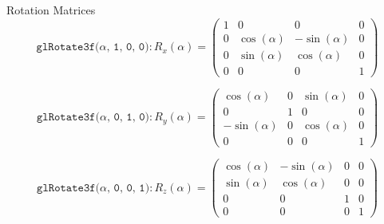 \documentclass[aspectratio=1610,xcolor=dvipsnames,t]{beamer}
\begin{document}
\begin{frame}{Rotation Matrices} 
        \begin{equation*} 
        \texttt{glRotate3f($\alpha$, 1, 0, 0)} :
            R_x(\alpha) = \left(
                        \begin{array}{cccc}
                            1   & 0             & 0                 & 0 \\
                            0   & \cos(\alpha)  & -\sin(\alpha)     & 0 \\
                            0   & \sin(\alpha)  &  \cos(\alpha)    & 0 \\
                            0   & 0             & 0                 & 1
                        \end{array} 
                    \right)
        \end{equation*} 

        \begin{equation*} 
        \texttt{glRotate3f($\alpha$, 0, 1, 0)} :
            R_y(\alpha) = \left(
                        \begin{array}{cccc}
                            \cos(\alpha)    & 0             & \sin(\alpha)      & 0 \\
                            0               & 1             & 0                 & 0 \\
                            -\sin(\alpha)   & 0             & \cos(\alpha)      & 0 \\
                            0               & 0             & 0                 & 1
                        \end{array} 
                    \right)
        \end{equation*} 

        \begin{equation*} 
        \texttt{glRotate3f($\alpha$, 0, 0, 1)} :
            R_z(\alpha) = \left(
                        \begin{array}{cccc}
                            \cos(\alpha)    & -\sin(\alpha) & 0 & 0 \\
                            \sin(\alpha)    & \cos(\alpha)  & 0 & 0 \\
                            0               & 0             & 1 & 0 \\
                            0               & 0             & 0 & 1
                        \end{array} 
                    \right)
        \end{equation*} 
\end{frame} 
\end{document}
